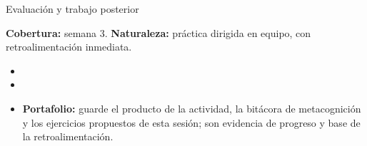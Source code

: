 \documentclass[10pt,aspectratio=169]{beamer}
\begin{document}
\begin{frame}{Evaluación y trabajo posterior}
  \small
  \begin{evalbox}
    \textbf{Cobertura:} semana 3. \textbf{Naturaleza:} práctica dirigida en equipo, con retroalimentación inmediata.
  \end{evalbox}
  \begin{itemize}
    \item \criterios
    \item \declaracionia
    \item \textbf{Portafolio:} guarde el producto de la actividad, la bitácora de metacognición y los ejercicios propuestos de esta sesión; son evidencia de progreso y base de la retroalimentación.
  \end{itemize}
\end{frame}
\end{document}
